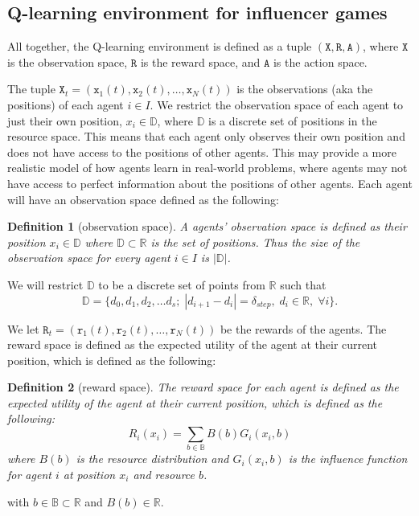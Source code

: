\documentclass{article}
\newtheorem{definition}{Definition}
\newcommand {\R}{\mathbb{R}}
\newcommand {\D}{\mathbb{D}}
\newcommand {\B}{\mathbb{B}}
\begin{document}
        \subsection{Q-learning environment for influencer games}
            All together, the Q-learning environment is defined as a tuple $(\texttt{X},\texttt{R},\texttt{A})$, where $\texttt{X}$ is the observation space, $\texttt{R}$ is the reward space, and $\texttt{A}$ is the action space. 
            

            The tuple $\texttt{X}_{t}=(\texttt{x}_1(t),\texttt{x}_2(t),\dots,\texttt{x}_N(t))$ is the observations (aka the positions) of each agent $i\in I$.
            We restrict the observation space of each agent to just their own position, $x_i\in \D$, where $\D$ is a discrete set of positions in the resource space. This means that each agent only observes their own position and does not have access to the positions of other agents. This may provide a more realistic model of how agents learn in real-world problems, where agents may not have access to perfect information about the positions of other agents. Each agent will have an observation space defined as the following:
             \begin{definition}[observation space]
                 A agents' observation space is defined as their position $x_i\in \D$ where $\D\subset \R$ is the set of positions. Thus the size of the observation space for every agent $i\in I$ is $|\D|$.  
             \end{definition}
             We will restrict $\D$ to be a discrete set of points from $\R$ such that 
             \begin{equation}
                 \D=\{d_0,d_1,d_2,\dots d_s;\; |d_{i+1}-d_i|=\delta_{step},\;d_i\in\R,\; \forall i\}.
             \end{equation}


            We let $\texttt{R}_t=(\texttt{r}_1(t),\texttt{r}_2(t),\dots,\texttt{r}_N(t))$  be the rewards of the agents. The reward space is defined as the expected utility of the agent at their current position, which is defined as the following:
             \begin{definition}[reward space]
                 The reward space for each agent is defined as the expected utility of the agent at their current position, which is defined as the following:
                 \begin{equation}
                     R_i(x_i)=\sum_{b\in \B} B(b)G_i(x_i,b)
                 \end{equation}
                 where $B(b)$ is the resource distribution and $G_i(x_i,b)$ is the influence function for agent $i$ at position $x_i$ and resource $b$.
            \end{definition}
            with $b\in\B\subset\R$ and $B(b)\in\R$.
            
\end{document}
